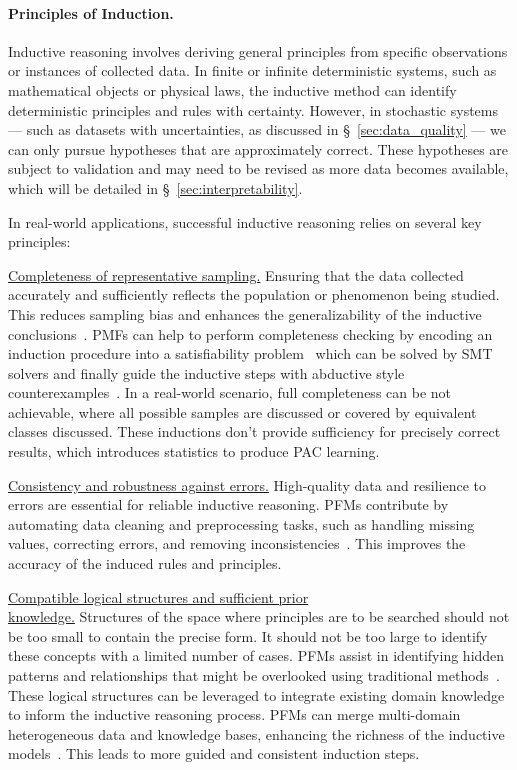 \paragraph{Principles of Induction.} Inductive reasoning involves deriving general principles from specific observations or instances of collected data. In finite or infinite deterministic systems, such as mathematical objects or physical laws, the inductive method can identify deterministic principles and rules with certainty. However, in stochastic systems — such as datasets with uncertainties, as discussed in \S~\ref{sec:data_quality} — we can only pursue hypotheses that are approximately correct. These hypotheses are subject to validation and may need to be revised as more data becomes available, which will be detailed in \S~\ref{sec:interpretability}.
  
  
In real-world applications, successful inductive reasoning relies on several key principles:
  
\underline{Completeness of representative sampling.} Ensuring that the data collected accurately and sufficiently reflects the population or phenomenon being studied. This reduces sampling bias and enhances the generalizability of the inductive conclusions~\cite{037little2019statistical}. PMFs can help to perform completeness checking by encoding an induction procedure into a satisfiability problem~\cite{ye2024satlm} which can be solved by SMT solvers and finally guide the inductive steps with abductive style counterexamples~\cite{jha2023counterexample}. In a real-world scenario, full completeness can be not achievable, where all possible samples are discussed or covered by equivalent classes discussed. These inductions don't provide sufficiency for precisely correct results, which introduces statistics to produce PAC learning.
      
\underline{Consistency and robustness against errors.} High-quality data and resilience to errors are essential for reliable inductive reasoning. PFMs contribute by automating data cleaning and preprocessing tasks, such as handling missing values, correcting errors, and removing inconsistencies~\cite{ni2024iterclean, qi2024cleanagent}. This improves the accuracy of the induced rules and principles.
      
\underline{Compatible logical structures and sufficient prior} \\ \underline{knowledge.} Structures of the space where principles are to be searched should not be too small to contain the precise form. It should not be too large to identify these concepts with a limited number of cases. PFMs assist in identifying hidden patterns and relationships that might be overlooked using traditional methods~\cite{ma2023insightpilot, Dibia2023LIDAAT}. These logical structures can be leveraged to integrate existing domain knowledge to inform the inductive reasoning process. PFMs can merge multi-domain heterogeneous data and knowledge bases, enhancing the richness of the inductive models~\cite{Ellis2020DreamCoderGG, Tang2024WorldCoderAM}. This leads to more guided and consistent induction steps.
      
